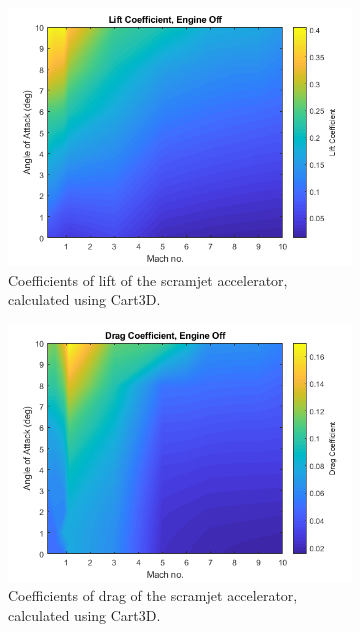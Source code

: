 \begin{figure}[!ht]
	\begin{subfigure}{.5\textwidth}
		\centering
		\includegraphics[width=0.99\linewidth]{figures/3_vehicle_design/Cl}
		\caption{Coefficients of lift of the scramjet accelerator, calculated using Cart3D.}
		\label{fig:Cl}
	\end{subfigure}
	\begin{subfigure}{.5\textwidth}
		\centering
		\includegraphics[width=0.99\linewidth]{figures/3_vehicle_design/Cd}
		\caption{Coefficients of drag of the scramjet accelerator, calculated using Cart3D.}
		\label{fig:Cd}
	\end{subfigure}
	\begin{subfigure}{.5\textwidth}

\end{subfigure}
\end{figure}
